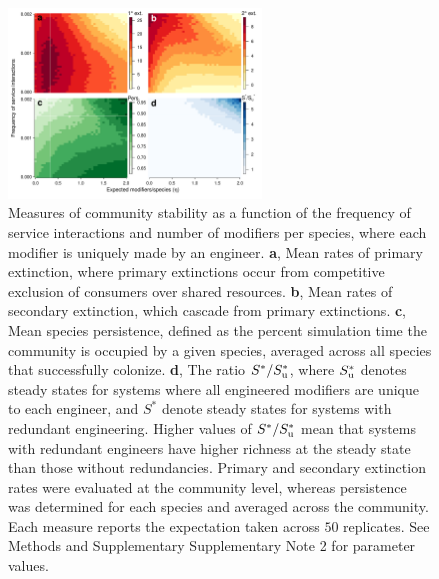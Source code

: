 \documentclass[onecolumn,preprintnumbers,amsmath,amssymb,superscriptaddress]{revtex4-1}
\begin{document}
\begin{bibunit}
\begin{figure}[h!]
\centering
\includegraphics[width=0.6\textwidth]{fig_engineers6_unique.pdf}
\caption{
Measures of community stability as a function of the frequency of service interactions and number of modifiers per species, where each modifier is uniquely made by an engineer.
\textbf{a}, Mean rates of primary extinction, where primary extinctions occur from competitive exclusion of consumers over shared resources.
\textbf{b}, Mean rates of secondary extinction, which cascade from primary extinctions.
\textbf{c}, Mean species persistence, defined as the percent simulation time the community is occupied by a given species, averaged across all species that successfully colonize.
\textbf{d}, The ratio $S^*/S^*_{\rm u}$, where $S^*_{\rm u}$ denotes steady states for systems where all engineered modifiers are unique to each engineer, and $S^*$ denote steady states for systems with redundant engineering. Higher values of $S^*/S^*_{\rm u}$ mean that systems with redundant engineers have higher richness at the steady state than those without redundancies.
Primary and secondary extinction rates were evaluated at the community level, whereas persistence was determined for each species and averaged across the community.
Each measure reports the expectation taken across $50$ replicates.
See Methods and Supplementary Supplementary Note 2 for parameter values.
}
\label{fig:unique}
\end{figure}


\end{bibunit}
\end{document}
